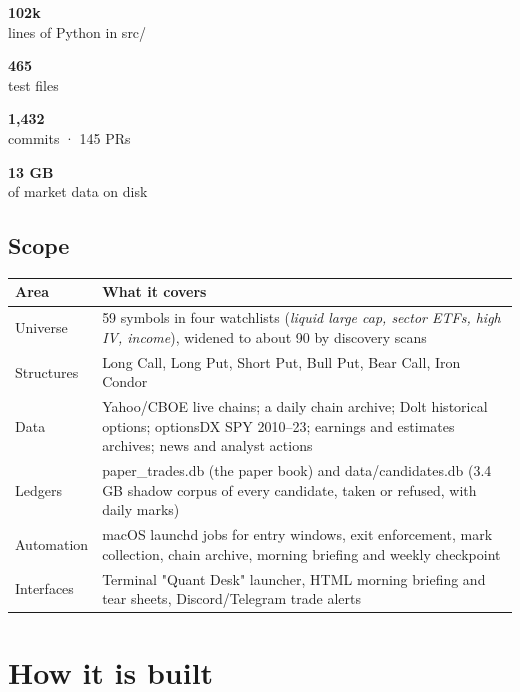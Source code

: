 \documentclass[11pt,a4paper]{article}
\newcommand{\stat}[2]{%
  \begin{tcolorbox}[enhanced,colback=white,colframe=rule,boxrule=0.6pt,arc=2pt,
    width=\linewidth,halign=center,top=4pt,bottom=4pt]
    {\sffamily\bfseries\LARGE\color{navy}#1}\\[1pt]
    {\sffamily\footnotesize\color{gray}#2}
  \end{tcolorbox}}
\newcommand{\code}[1]{{\ttfamily\small #1}}
\begin{document}
\begin{center}
\begin{minipage}{0.23\textwidth}\stat{102k}{lines of Python in \code{src/}}\end{minipage}\hfill
\begin{minipage}{0.23\textwidth}\stat{465}{test files}\end{minipage}\hfill
\begin{minipage}{0.23\textwidth}\stat{1,432}{commits · 145 PRs}\end{minipage}\hfill
\begin{minipage}{0.23\textwidth}\stat{13 GB}{of market data on disk}\end{minipage}
\end{center}

\subsection{Scope}
\begin{tabularx}{\textwidth}{@{}l X@{}}
\toprule
\textbf{Area} & \textbf{What it covers} \\
\midrule
Universe & 59 symbols in four watchlists (\emph{liquid large cap, sector ETFs, high IV, income}), widened to about 90 by discovery scans \\
Structures & Long Call, Long Put, Short Put, Bull Put, Bear Call, Iron Condor \\
Data & Yahoo/CBOE live chains; a daily chain archive; Dolt historical options; optionsDX SPY 2010--23; earnings and estimates archives; news and analyst actions \\
Ledgers & \code{paper\_trades.db} (the paper book) and \code{data/candidates.db} (3.4 GB shadow corpus of every candidate, taken or refused, with daily marks) \\
Automation & macOS launchd jobs for entry windows, exit enforcement, mark collection, chain archive, morning briefing and weekly checkpoint \\
Interfaces & Terminal "Quant Desk" launcher, HTML morning briefing and tear sheets, Discord/Telegram trade alerts \\
\bottomrule
\end{tabularx}

\section{How it is built}
\end{document}
